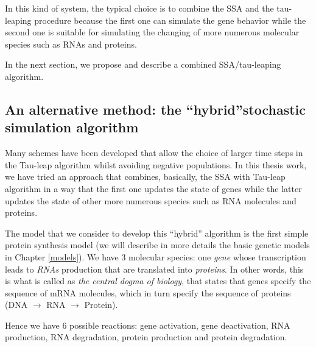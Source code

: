 \documentclass[12pt,a4paper]{report}
\begin{document}
In this kind of system, the typical choice is to combine the SSA and the tau-leaping procedure because the first one can simulate the gene behavior while the second one is suitable for simulating the changing of more numerous molecular species such as RNAs and proteins.

In the next section, we propose and describe a combined SSA/tau-leaping algorithm.

\subsection{An alternative method: the ``hybrid''stochastic simulation algorithm}




Many schemes have been developed that allow the choice of larger time steps in the Tau-leap algorithm whilst avoiding negative populations. In this thesis work, we have tried an approach that combines, basically, the SSA with Tau-leap algorithm in a way that the first one updates the state of genes while the latter updates the state of other more numerous species such as RNA molecules and proteins.

The model that we consider to develop this ``hybrid'' algorithm is the first simple protein synthesis model (we will describe in more details the basic genetic models in Chapter \ref{models}). We have 3 molecular species: one \emph{gene} whose transcription leads to \emph{RNAs} production that are translated into \emph{proteins}. In other words, this is what is called as \emph{the central dogma of biology}, that states that genes specify the sequence of mRNA molecules, which in turn specify the sequence of proteins (DNA $\rightarrow$ RNA $\rightarrow$ Protein).

Hence we have 6 possible reactions: gene activation, gene deactivation, RNA production, RNA degradation, protein production and protein degradation.
\end{document}
